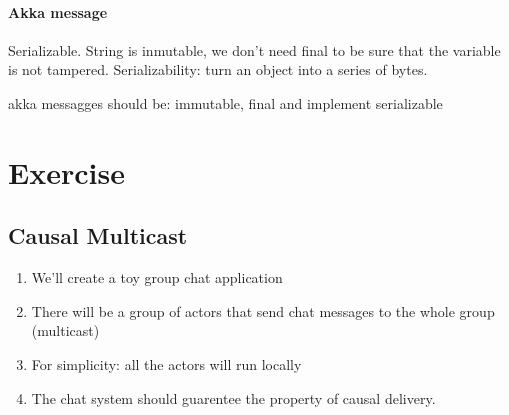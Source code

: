 \documentclass[11pt]{article}
\begin{document}
\paragraph{Akka message} %
\label{par:akka_message}
Serializable. String is inmutable, we don't need final to be sure that the variable is not tampered.
Serializability: turn an object into a series of bytes.

akka messagges should be: immutable, final and implement serializable


\section{Exercise} %
\label{sec:exercise}
\subsection{Causal Multicast} %
\label{sub:causal_multicast}
\begin{enumerate}
	\item We'll create a toy group chat application
	\item There will be a group of actors that send chat messages to the whole group (multicast)
	\item For simplicity: all the actors will run locally 
	\item The chat system should guarentee the property of causal delivery.
\end{enumerate}
\end{document}

